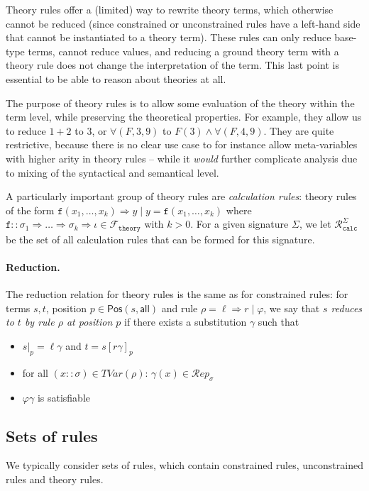 \documentclass{lmcs}
\theoremstyle{theorem}\newtheorem{theorem}{Theorem}
\theoremstyle{theorem}\newtheorem{lemma}[theorem]{Lemma}
\theoremstyle{theorem}\newtheorem{corollary}[theorem]{Corollary}
\theoremstyle{definition}\newtheorem{definition}[theorem]{Definition}
\theoremstyle{definition}\newtheorem{example}[theorem]{Example}
\newcommand{\thF}{\mathcal{F}_{\mathtt{theory}}}
\newcommand{\Rulescalc}{\mathcal{R}_{\mathtt{calc}}}
\newcommand{\Positions}{\mathsf{Pos}}
\newcommand{\Reps}[1]{\mathcal{R}\!\mathit{ep}_{#1}}
\newcommand{\TLVar}[1]{\mathit{TVar}(#1)}
\newcommand{\asort}{\iota}
\newcommand{\atype}{\sigma}
\newcommand{\identifier}[1]{\mathtt{#1}}
\newcommand{\afun}{\identifier{f}}
\newcommand{\avar}{x}
\newcommand{\bvar}{y}
\newcommand{\arrtype}{\Rightarrow}
\newcommand{\arrz}{\Rightarrow}
\newcommand{\myparagraph}[1]{\paragraph{\textbf{#1.}}}
\begin{document}
Theory rules offer a (limited) way to rewrite theory terms, which otherwise
cannot be reduced (since constrained or unconstrained rules have a left-hand
side that cannot be instantiated to a theory term).  These rules can only
reduce base-type terms, cannot reduce values, and reducing a ground theory
term with a theory rule does not change the interpretation of the term.
This last point is essential to be able to reason about theories at all.

The purpose of theory rules is to allow some evaluation of the theory within the
term level, while preserving the theoretical properties.  For example, they
allow us to reduce $1+2$ to $3$, or $\forall(F,3,9)$ to $F(3) \wedge \forall(F,
4,9)$.  They are quite restrictive, because there is no clear use case to for
instance allow meta-variables with higher arity in theory rules -- while it
\emph{would} further complicate analysis due to mixing of the syntactical and
semantical level.

A particularly important group of theory rules are \emph{calculation rules}:
theory rules of the form
  $\afun(\avar_1,\dots,\avar_k) \arrz \bvar \mid \bvar = \afun(\avar_1,\dots,
  \avar_k)$ where $\afun :: \atype_1 \arrtype \dots \arrtype \atype_k \arrtype
  \asort \in \thF$ with $k > 0$.
For a given signature $\Sigma$, we let $\Rulescalc^\Sigma$ be the set of all
calculation rules that can be formed for this signature.

\myparagraph{Reduction}
The reduction relation for theory rules is the same as for constrained rules:
for terms $s,t$, position $p \in \Positions(s,\mathsf{all})$ and rule $\rho =
\ell \arrz r \mid \varphi$, we say that \emph{$s$ reduces to $t$ by rule $\rho$
at position $p$} if there exists a substitution $\gamma$ such that
\begin{itemize}
\item $s|_p = \ell\gamma$ and $t = s[r\gamma]_p$
\item for all $(\avar :: \atype) \in \TLVar{\rho}$:
  $\gamma(\avar) \in \Reps{\atype}$
\item $\varphi\gamma$ is satisfiable
\end{itemize}

\subsection{Sets of rules}

We typically consider sets of rules, which contain constrained rules,
unconstrained rules and theory rules.
\end{document}
